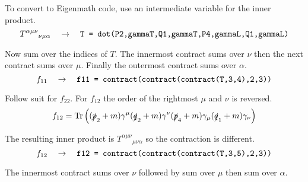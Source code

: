 To convert to Eigenmath code, use an intermediate variable for the inner product.
\begin{equation*}
T^{\alpha\mu\nu}{}_{\nu\mu\alpha}
\quad\rightarrow\quad
\text{\tt T = dot(P2,gammaT,Q1,gammaT,P4,gammaL,Q1,gammaL)}
\end{equation*}

Now sum over the indices of $T$.
The innermost contract sums over $\nu$ then the next contract sums over $\mu$.
Finally the outermost contract sums over $\alpha$.
\begin{equation*}
f_{11}\quad\rightarrow\quad
\text{\tt f11 = contract(contract(contract(T,3,4),2,3))}
\end{equation*}

Follow suit for $f_{22}$.
For $f_{12}$ the order of the rightmost $\mu$ and $\nu$ is reversed.
\begin{equation*}
f_{12}=\mathop{\rm Tr}
\left(
(\slashed{p}_2+m)\gamma^\mu(\slashed{q}_2+m)\gamma^\nu(\slashed{p}_4+m)\gamma_\mu(\slashed{q}_1+m)\gamma_\nu
\right)
\end{equation*}

The resulting inner product is $T^{\alpha\mu\nu}{}_{\mu\nu\alpha}$
so the contraction is different.
\begin{equation*}
f_{12}
\quad\rightarrow\quad
\text{\tt f12 = contract(contract(contract(T,3,5),2,3))}
\end{equation*}

The innermost contract sums over $\nu$ followed by sum over $\mu$ then sum over $\alpha$.
\fi


